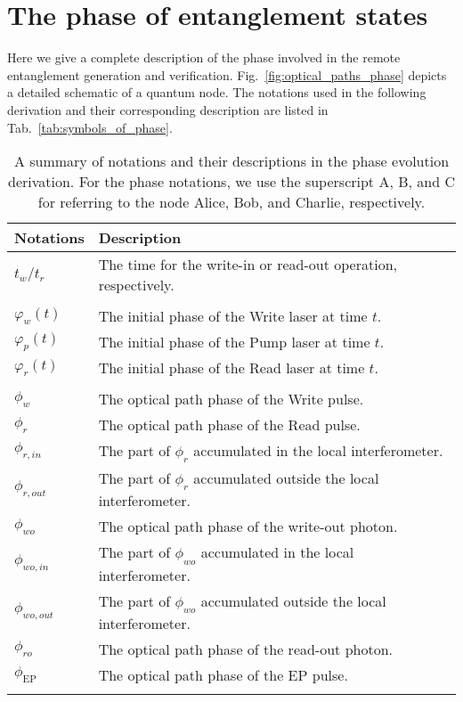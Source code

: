 \documentclass[aps,reprint,showpacs,superscriptaddress]{revtex4-2}
\begin{document}
\section{The phase of entanglement states}
Here we give a complete description of the phase involved in the remote entanglement generation and verification. Fig.~\ref{fig:optical_paths_phase} depicts a detailed schematic of a quantum node. The notations used in the following derivation and their corresponding description are listed in Tab.~\ref{tab:symbols_of_phase}. 

\begin{table*}[ht]
	\centering
	\caption{A summary of notations and their descriptions in the phase evolution derivation. For the phase notations, we use the superscript A, B, and C for referring to the node Alice, Bob, and Charlie, respectively.}
	\begin{tabular}[t]{C{2cm} C{10cm}}
	\toprule
	Notations & Description \\
	\midrule
	$t_w/t_r$& The time for the write-in or read-out operation, respectively.\\
	\\
	$\varphi_w(t)$& The initial phase of the Write laser at time $t$.\\
	$\varphi_p(t)$& The initial phase of the Pump laser at time $t$.\\
	$\varphi_r(t)$& The initial phase of the Read laser at time $t$.\\
	\\
	$\phi_w$& The optical path phase of the Write pulse.\\
	$\phi_r$& The optical path phase of the Read pulse.\\
	$\phi_{r, in}$& The part of $\phi_{r}$ accumulated in the local interferometer.\\
	$\phi_{r, out}$& The part of $\phi_{r}$ accumulated outside the local interferometer.\\
	$\phi_{wo}$& The optical path phase of the write-out photon.\\
	$\phi_{wo, in}$& The part of $\phi_{wo}$ accumulated in the local interferometer.\\
	$\phi_{wo, out}$& The part of $\phi_{wo}$ accumulated outside the local interferometer.\\
	$\phi_{ro}$& The optical path phase of the read-out photon.\\
	$\phi_{\textrm{EP}}$& The optical path phase of the EP pulse.\\
	\\

\end{tabular}
\end{table*}
\end{document}
